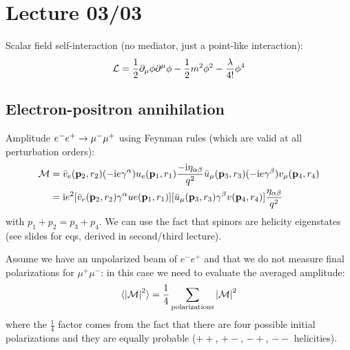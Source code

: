 
\chapter{Lecture 03/03}

Scalar field self-interaction (no mediator, just a point-like interaction):
\begin{equation}
  \mathcal{L} = \frac{1}{2} \partial_\mu \phi \partial^\mu \phi - \frac{1}{2} m^2 \phi^2 - \frac{\lambda}{4!} \phi^4
\end{equation}

\section{Electron-positron annihilation}

Amplitude $ e^- e^+ \rightarrow \mu^- \mu^+ $ using Feynman rules (which are valid at all perturbation orders):
\begin{equation*}
  \begin{split}
    \mathcal{M}
    & = \bar{v}_e(\mathbf{p}_2 , r_2) (-\mathrm{i} e \gamma^\alpha) u_e(\mathbf{p}_1 , r_1) \frac{-\mathrm{i} \eta_{\alpha \beta}}{q^2} \bar{u}_\mu(\mathbf{p}_3 , r_3) (-\mathrm{i} e \gamma^\beta) v_\mu(\mathbf{p}_4 , r_4) \\
    & = \mathrm{i} e^2 [\bar{v}_e(\mathbf{p}_2 , r_2) \gamma^\alpha ue(\mathbf{p}_1 , r_1)] [\bar{u}_\mu(\mathbf{p}_3 , r_3) \gamma^\beta v(\mathbf{p}_4 , r_4)] \frac{\eta_{\alpha \beta}}{q^2}
  \end{split}
\end{equation*}
with $ p_1 + p_2 = p_3 + p_4 $. We can use the fact that spinors are helicity eigenstates (see slides for eqs, derived in second/third lecture).

Assume we have an unpolarized beam of $ e^- e^+ $ and that we do not measure final polarizations for $ \mu^+ \mu^- $: in this case we need to evaluate the averaged amplitude:
\begin{equation}
  \braket{\left\lvert\mathcal{M}\right\rvert^2} = \frac{1}{4} \sum_{\text{polarizations}} \left\lvert\mathcal{M}\right\rvert^2
\end{equation}
where the $ \frac{1}{4} $ factor comes from the fact that there are four possible initial polarizations and they are equally probable ($ ++ $, $ +- $, $ -+ $, $ -- $ helicities).

